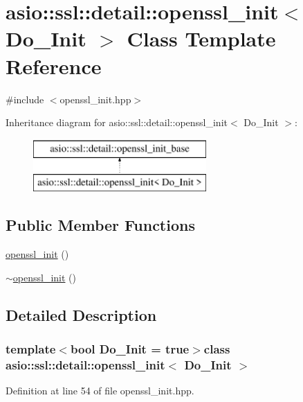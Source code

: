 \hypertarget{classasio_1_1ssl_1_1detail_1_1openssl__init}{}\section{asio\+:\+:ssl\+:\+:detail\+:\+:openssl\+\_\+init$<$ Do\+\_\+\+Init $>$ Class Template Reference}
\label{classasio_1_1ssl_1_1detail_1_1openssl__init}


{\ttfamily \#include $<$openssl\+\_\+init.\+hpp$>$}

Inheritance diagram for asio\+:\+:ssl\+:\+:detail\+:\+:openssl\+\_\+init$<$ Do\+\_\+\+Init $>$\+:\begin{figure}[H]
\begin{center}
\leavevmode
\includegraphics[height=2.000000cm]{classasio_1_1ssl_1_1detail_1_1openssl__init}
\end{center}
\end{figure}
\subsection*{Public Member Functions}
\begin{DoxyCompactItemize}
\item 
\hyperlink{classasio_1_1ssl_1_1detail_1_1openssl__init_a7e82447620111b6fb4eb7cbf2fe26c2e}{openssl\+\_\+init} ()
\item 
\hyperlink{classasio_1_1ssl_1_1detail_1_1openssl__init_a910b9f60c1ced40d0b371ca328baeb09}{$\sim$openssl\+\_\+init} ()
\end{DoxyCompactItemize}


\subsection{Detailed Description}
\subsubsection*{template$<$bool Do\+\_\+\+Init = true$>$class asio\+::ssl\+::detail\+::openssl\+\_\+init$<$ Do\+\_\+\+Init $>$}



Definition at line 54 of file openssl\+\_\+init.\+hpp.



